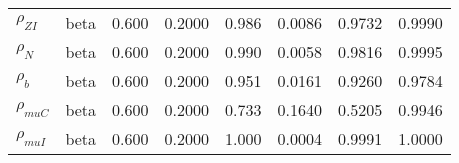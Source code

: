 \begin{center}
\begin{longtable}{llcccccc}
${\rho_{ZI}}$ & beta &   0.600 & 0.2000 &   0.986& 0.0086 &  0.9732 &  0.9990 \\ 
${\rho_N}$ & beta &   0.600 & 0.2000 &   0.990& 0.0058 &  0.9816 &  0.9995 \\ 
${\rho_b}$ & beta &   0.600 & 0.2000 &   0.951& 0.0161 &  0.9260 &  0.9784 \\ 
${\rho_{muC}}$ & beta &   0.600 & 0.2000 &   0.733& 0.1640 &  0.5205 &  0.9946 \\ 
${\rho_{muI}}$ & beta &   0.600 & 0.2000 &   1.000& 0.0004 &  0.9991 &  1.0000 \\ 
\end{longtable}
 \end{center}
